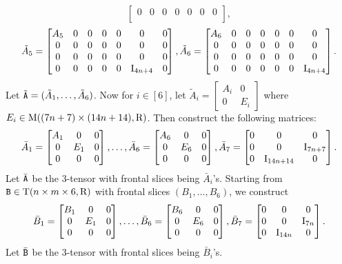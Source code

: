 \begin{example}
\[\begin{bmatrix}
	0 & 0 & 0 & 0 & 0 & 0 & 0 \\
\end{bmatrix}, \]
\[
\tilde A_5=\begin{bmatrix}
	A_5 & 0 & 0 & 0 & 0 & 0 & 0 \\
	0 & 0 & 0 & 0 & 0 & 0 & 0 \\
	0 & 0 & 0 & 0 & 0 & 0 & 0 \\
	0 & 0 & 0 & 0 & 0 & \mathrm{I}_{4n+4} & 0 \\
\end{bmatrix}, 
\tilde A_6=\begin{bmatrix}
	A_6 & 0 & 0 & 0 & 0 & 0 & 0 \\
	0 & 0 & 0 & 0 & 0 & 0 & 0 \\
	0 & 0 & 0 & 0 & 0 & 0 & 0 \\
	0 & 0 & 0 & 0 & 0 & 0 & \mathrm{I}_{4n+4} \\
\end{bmatrix}.
\]
Let $\tilde {\mathtt{A}}=(\tilde A_1, \dots, \tilde A_6)$. Now for $i\in[6]$, let $\tilde A_i=\begin{bmatrix}
	A_i & 0 \\
	0 & E_i
\end{bmatrix}$ where $E_i\in \mathrm{M}((7n+7)\times (14n+14), \mathrm{R})$. Then construct the following matrices: 
$$
\bar A_1=
\begin{bmatrix}
	A_1 & 0 & 0 \\
	0 & E_1 & 0 \\
	0 & 0 & 0 
\end{bmatrix},\dots,
\bar A_6=
\begin{bmatrix}
	A_6 & 0 & 0 \\
	0 & E_6 & 0 \\
	0 & 0 & 0 
\end{bmatrix}, 
\bar A_7=
\begin{bmatrix}
	0 & 0 & 0 \\
	0 & 0 & \mathrm{I}_{7n+7} \\
	0 & \mathrm{I}_{14n+14} & 0 
\end{bmatrix}.
$$
Let $\bar{\mathtt{A}}$ be the 3-tensor with frontal slices being $\bar A_i$'s.
Starting from $\mathtt{B}\in\mathrm{T}(n\times m\times 6, \mathrm{R})$ with frontal slices $(B_1, \dots, B_6)$, we construct 
$$
\bar B_1=
\begin{bmatrix}
	B_1 & 0 & 0 \\
	0 & E_1 & 0 \\
	0 & 0 & 0 
\end{bmatrix},\dots,
\bar B_6=
\begin{bmatrix}
	B_6 & 0 & 0 \\
	0 & E_6 & 0 \\
	0 & 0 & 0 
\end{bmatrix}, 
\bar B_7=
\begin{bmatrix}
	0 & 0 & 0 \\
	0 & 0 & \mathrm{I}_{7n} \\
	0 & \mathrm{I}_{14n} & 0 
\end{bmatrix}.
$$
Let $\bar{\mathtt{B}}$ be the 3-tensor with frontal slices being $\bar B_i$'s.


\end{example}
